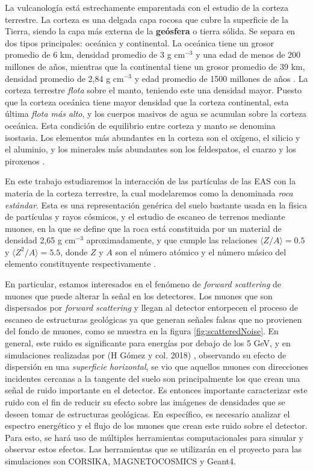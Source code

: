 \documentclass[12pt]{report}
\begin{document}
La vulcanología está estrechamente emparentada con el estudio de la corteza terrestre. La corteza es una delgada capa rocosa que cubre la superficie de la Tierra, siendo la capa más externa de la \textbf{geósfera} o tierra sólida. Se separa en dos tipos principales: oceánica y continental. La oceánica tiene un grosor promedio de 6 km, densidad promedio de 3 g cm$^{-3}$ y una edad de menos de 200 millones de años, mientras que la continental tiene un grosor promedio de 39 km, densidad promedio de 2,84 g cm$^{-3}$ y edad promedio de 1500 millones de años \cite{mooney20101}. La corteza terrestre \textit{flota} sobre el manto, teniendo este una densidad mayor. Puesto que la corteza oceánica tiene mayor densidad que la corteza continental, esta última \textit{flota más alto}, y los cuerpos masivos de agua se acumulan sobre la corteza oceánica. Esta condición de equilibrio entre corteza y manto se denomina isostasia. Los elementos más abundantes en la corteza son el oxígeno, el silicio y el aluminio, y los minerales más abundantes son los feldespatos, el cuarzo y los piroxenos \cite{anderson2010geomorphology}.

En este trabajo estudiaremos la interacción de las partículas de las EAS con la materia de la corteza terrestre, la cual modelaremos como la denominada \textit{roca estándar}. Esta es una representación genérica del suelo bastante usada en la física de partículas y rayos cósmicos, y el estudio de escaneo de terrenos mediante muones, en la que se define que la roca está constituida por un material de densidad 2,65 g cm$^{-3}$ aproximadamente, y que cumple las relaciones $\langle Z/A \rangle=0.5$ y $\langle Z^2/A \rangle=5.5$, donde $Z$ y $A$ son el número atómico y el número másico del elemento constituyente respectivamente \cite{groom2001muon}.

En particular, estamos interesados en el fenómeno de \textit{forward scattering} de muones que puede alterar la señal en los detectores. Los muones que son dispersados por \textit{forward scattering} y llegan al detector entorpecen el proceso de escaneo de estructuras geológicas ya que generan señales falsas que no provienen del fondo de muones, como se muestra en la figura \ref{fig:scatteredNoise}. En general, este ruido es significante para energías por debajo de los 5 GeV, y en simulaciones realizadas por (H Gómez y col. 2018) \cite{gomez2017forward}, observando su efecto de dispersión en una \textit{superficie horizontal}, se vio que aquellos muones con direcciones incidentes cercanas a la tangente del suelo son principalmente los que crean una señal de ruido importante en el detector. Es entonces importante caracterizar este ruido con el fin de reducir su efecto sobre las imágenes de densidades que se deseen tomar de estructuras geológicas. En específico, es necesario analizar el espectro energético y el flujo de los muones que crean este ruido sobre el detector. Para esto, se hará uso de múltiples herramientas computacionales para simular y observar estos efectos. Las herramientas que se utilizarán en el proyecto para las simulaciones son CORSIKA, MAGNETOCOSMICS y Geant4.
\end{document}
